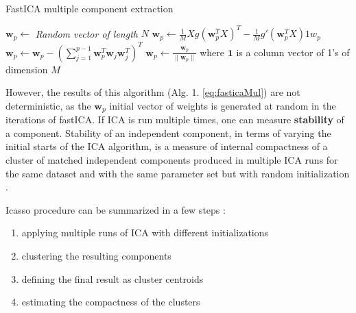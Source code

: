 \documentclass[12pt,]{book}
\providecommand{\tightlist}{%
  \setlength{\itemsep}{0pt}\setlength{\parskip}{0pt}}
\theoremstyle{definition}
\theoremstyle{definition}
\theoremstyle{definition}
\theoremstyle{remark}
\begin{document}
\begin{algorithm}
\caption{ FastICA multiple component extraction}
\begin{algorithmic}[1]
\begin{equation}\label{eq:fasticaMul}\end{equation}
\State $\mathbf{w}_{p} \gets$ \emph{Random vector of length} $N$
\State $\mathbf{w}_p \gets \frac{1}{M}Xg(\mathbf{w}_p^TX)^T - \frac{1}{M}g'(\mathbf{w}_p^TX)1w_p$
\State $\mathbf{w}_p \gets \mathbf{w}_p - (\sum_{j=1}^{p-1}\mathbf{w}_p^T\mathbf{w}_j\mathbf{w}_j^T)^T$
\State $\mathbf{w}_p \gets \frac{\mathbf{w}_p}{\lVert \mathbf{w}_p \rVert}$
\EndWhile
\EndFor
\State where $\mathbf {1}$  is a column vector of 1's of dimension $M$
\end{algorithmic}
\end{algorithm}

However, the results of this algorithm (Alg. 1. \eqref{eq:fasticaMul}) are
not deterministic, as the \(\mathbf{w}_{p}\) initial vector of weights
is generated at random in the iterations of fastICA. If ICA is run
multiple times, one can measure \textbf{stability} of a component.
Stability of an independent component, in terms of varying the initial
starts of the ICA algorithm, is a measure of internal compactness of a
cluster of matched independent components produced in multiple ICA runs
for the same dataset and with the same parameter set but with random
initialization \citep{Himberg2003}.

Icasso procedure can be summarized in a few steps :

\begin{enumerate}
\def\labelenumi{\arabic{enumi}.}
\tightlist
\item
  applying multiple runs of ICA with different initializations
\item
  clustering the resulting components
\item
  defining the final result as cluster centroids
\item
  estimating the compactness of the clusters
\end{enumerate}
\end{document}

